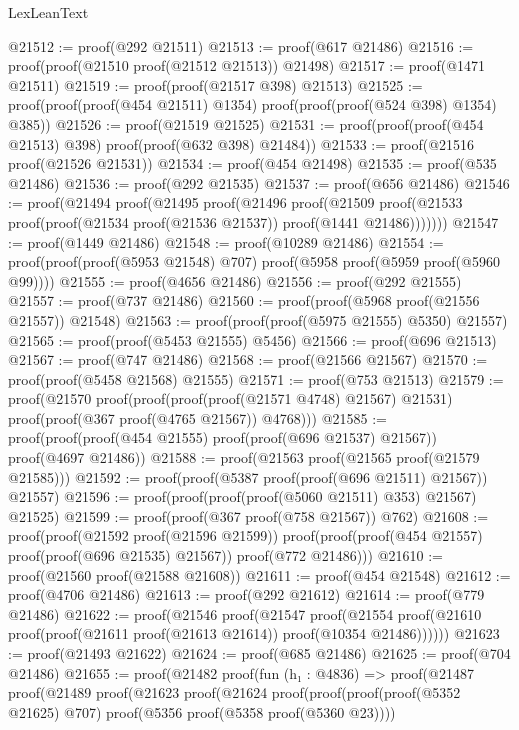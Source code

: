\begin{lexlean}{LexLeanText}
\begin{coremodule}
@21512 := proof(@292 @21511)
@21513 := proof(@617 @21486)
@21516 := proof(proof(@21510 proof(@21512 @21513)) @21498)
@21517 := proof(@1471 @21511)
@21519 := proof(proof(@21517 @398) @21513)
@21525 := proof(proof(proof(@454 @21511) @1354) proof(proof(proof(@524 @398) @1354) @385))
@21526 := proof(@21519 @21525)
@21531 := proof(proof(proof(@454 @21513) @398) proof(proof(@632 @398) @21484))
@21533 := proof(@21516 proof(@21526 @21531))
@21534 := proof(@454 @21498)
@21535 := proof(@535 @21486)
@21536 := proof(@292 @21535)
@21537 := proof(@656 @21486)
@21546 := proof(@21494
      proof(@21495
          proof(@21496
              proof(@21509
                  proof(@21533 proof(proof(@21534 proof(@21536 @21537)) proof(@1441 @21486)))))))
@21547 := proof(@1449 @21486)
@21548 := proof(@10289 @21486)
@21554 := proof(proof(proof(@5953 @21548) @707) proof(@5958 proof(@5959 proof(@5960 @99))))
@21555 := proof(@4656 @21486)
@21556 := proof(@292 @21555)
@21557 := proof(@737 @21486)
@21560 := proof(proof(@5968 proof(@21556 @21557)) @21548)
@21563 := proof(proof(proof(@5975 @21555) @5350) @21557)
@21565 := proof(proof(@5453 @21555) @5456)
@21566 := proof(@696 @21513)
@21567 := proof(@747 @21486)
@21568 := proof(@21566 @21567)
@21570 := proof(proof(@5458 @21568) @21555)
@21571 := proof(@753 @21513)
@21579 := proof(@21570
      proof(proof(proof(proof(@21571 @4748) @21567) @21531)
          proof(proof(@367 proof(@4765 @21567)) @4768)))
@21585 := proof(proof(proof(@454 @21555) proof(proof(@696 @21537) @21567)) proof(@4697 @21486))
@21588 := proof(@21563 proof(@21565 proof(@21579 @21585)))
@21592 := proof(proof(@5387 proof(proof(@696 @21511) @21567)) @21557)
@21596 := proof(proof(proof(proof(@5060 @21511) @353) @21567) @21525)
@21599 := proof(proof(@367 proof(@758 @21567)) @762)
@21608 := proof(proof(@21592 proof(@21596 @21599))
      proof(proof(proof(@454 @21557) proof(proof(@696 @21535) @21567)) proof(@772 @21486)))
@21610 := proof(@21560 proof(@21588 @21608))
@21611 := proof(@454 @21548)
@21612 := proof(@4706 @21486)
@21613 := proof(@292 @21612)
@21614 := proof(@779 @21486)
@21622 := proof(@21546
      proof(@21547
          proof(@21554
              proof(@21610 proof(proof(@21611 proof(@21613 @21614)) proof(@10354 @21486))))))
@21623 := proof(@21493 @21622)
@21624 := proof(@685 @21486)
@21625 := proof(@704 @21486)
@21655 := proof(@21482
      proof(fun (h₁ : @4836) =>
        proof(@21487
            proof(@21489
                proof(@21623
                    proof(@21624
                        proof(proof(proof(proof(@5352 @21625) @707)
                              proof(@5356 proof(@5358 proof(@5360 @23))))

\end{coremodule}
\end{lexlean}
